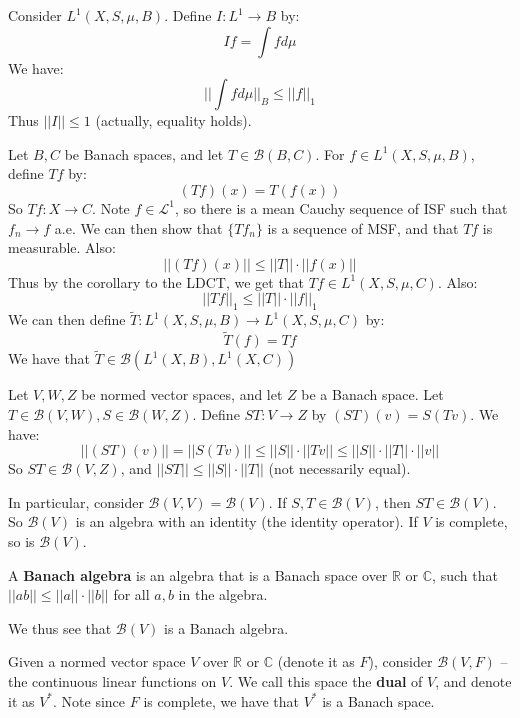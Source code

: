 \documentclass[a4paper,12pt]{report}
\newcommand{\ms}[1]{\mathscr{#1}}
\newenvironment{definition}[1][Definition.]{\begin{trivlist}
\item[\hskip \labelsep {\bfseries #1}]}{\end{trivlist}}
\newenvironment{example}[1][Example.]{\begin{trivlist}
\item[\hskip \labelsep {\bfseries #1}]}{\end{trivlist}}
\begin{document}
	\begin{example}
	Consider $L^1(X, S, \mu, B)$. Define $I : L^1 \rightarrow B$ by:
	\[ If = \int f  d\mu \]
	We have:
	\[ ||\int f d\mu ||_B \leq ||f||_1 \]
	Thus $||I|| \leq 1$ (actually, equality holds).
	\end{example}

	\begin{example}
	Let $B, C$ be Banach spaces, and let $T \in \ms{B}(B, C)$. For $f \in L^1(X, S, \mu, B)$, define $Tf$ by:
	\[ (Tf)(x) = T(f(x)) \]
	So $Tf : X \rightarrow C$. Note $f \in \ms{L}^1$, so there is a mean Cauchy sequence of ISF such that $f_n \rightarrow f$ a.e. We can then show that $\{Tf_n\}$ is a sequence of MSF, and that $Tf$ is measurable. Also:
	\[ ||(Tf)(x)|| \leq ||T|| \cdot ||f(x)|| \]
	Thus by the corollary to the LDCT, we get that $Tf \in L^1(X, S, \mu, C)$. Also:
	\[ ||Tf||_1 \leq ||T|| \cdot ||f||_1 \]
	We can then define $\tilde{T} : L^1(X, S, \mu, B) \rightarrow L^1(X, S, \mu, C)$ by:
	\[ \tilde{T}(f) = Tf \]
	We have that $\tilde{T} \in \ms{B}(L^1(X, B), L^1(X, C))$
	\end{example}	
	
	\begin{example}
	Let $V, W, Z$ be normed vector spaces, and let $Z$ be a Banach space. Let $T \in \ms{B}(V, W), S \in \ms{B}(W, Z)$. Define $ST : V \rightarrow Z$ by $(ST)(v) = S(Tv)$. We have:
	\[ ||(ST)(v)|| = ||S(Tv)|| \leq ||S|| \cdot ||Tv|| \leq ||S|| \cdot ||T|| \cdot ||v|| \]
	So $ST \in \ms{B}(V, Z)$, and $||ST|| \leq ||S|| \cdot ||T||$ (not necessarily equal). 
	
	In particular, consider $\ms{B}(V, V) = \ms{B}(V)$. If $S, T \in \ms{B}(V)$, then $ST \in \ms{B}(V)$. So $\ms{B}(V)$ is an algebra with an identity (the identity operator). If $V$ is complete, so is $\ms{B}(V)$. 
	\end{example}
	
	\begin{definition}
	A \textbf{Banach algebra} is an algebra that is a Banach space over $\mathbb{R}$ or $\mathbb{C}$, such that $||ab|| \leq ||a|| \cdot ||b||$ for all $a, b$ in the algebra.
	\end{definition}
	
	\noindent We thus see that $\ms{B}(V)$ is a Banach algebra.
	
	\begin{definition}
	Given a normed vector space $V$ over $\mathbb{R}$ or $\mathbb{C}$ (denote it as $F$), consider $\ms{B}(V, F)$ -- the continuous linear functions on $V$. We call this space the \textbf{dual} of $V$, and denote it as $V^*$. Note since $F$ is complete, we have that $V^*$ is a Banach space. 
	\end{definition}
\end{document}
